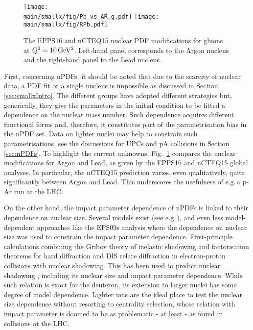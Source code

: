 \documentclass[../report.tex]{subfiles}
\providecommand{\main}{..}
\begin{document}
\begin{figure}[htb!]
\centering
\texttt{[image: \\main/smallx/fig/Pb\_vs\_AR\_g.pdf]}
\texttt{[image: \\main/smallx/fig/RPb.pdf]}
\caption{The EPPS16 and nCTEQ15 nuclear PDF modifications for gluons at $Q^2=10\,{\rm GeV^2}$. 
Left-hand panel corresponds to the Argon nucleus and the right-hand panel to the Lead nucleus.} 
\label{fig:lightnPDF}
\end{figure}

First, concerning nPDFs, it should be noted that due to the scarcity of nuclear data, a PDF fit or a single nucleus is impossible as discussed in Section \ref{sec:smallxIntro}. The different groups \cite{deFlorian:2011fp,Kovarik:2015cma,Eskola:2016oht}  have adopted different strategies but, generically, they give the parameters in the initial condition to be fitted a dependence on the nuclear mass number. Such dependence acquires different functional forms and, therefore, it constitutes part of the parametrisation bias in the nPDF set. Data on lighter nuclei may help to constrain such parametrisations, see the discussions for UPCs and pA collisions in Section \ref{sec:nPDFs}. To highlight the current unknowns, Fig.~\ref{fig:lightnPDF} compares the nuclear modifications for Argon and Lead, as given by the EPPS16 and nCTEQ15 global analyses. In particular, the nCTEQ15 prediction varies, even qualitatively, quite significantly between Argon and Lead. This underscores the usefulness of e.g.\,a p-Ar run at the LHC.  

On the other hand, the impact parameter dependence of nPDFs is linked to their dependence on nuclear size. Several models exist (see e.g.\,\cite{Emelyanov:1998phs,Ferreiro:2008wc}), and even less model-dependent approaches like the EPS09s analysis \cite{Helenius:2012wd} where the dependence on nuclear size was used to constrain the impact parameter dependence. First-principle calculations combining the Gribov theory of inelastic shadowing and factorisation theorems for hard diffraction and DIS relate diffraction in electron-proton collisions with nuclear shadowing. This has been used to predict nuclear shadowing \cite{Frankfurt:2011cs,Armesto:2003fi}, including its nuclear size and impact parameter dependence. While such relation is exact for the deuteron, its extension to larger nuclei has some degree of model dependence. Lighter ions are the ideal place to test the nuclear size dependence without resorting to centrality selection, whose relation with impact parameter is doomed to be as problematic - at least - as found in \pPb collisions at the LHC.
\end{document}
